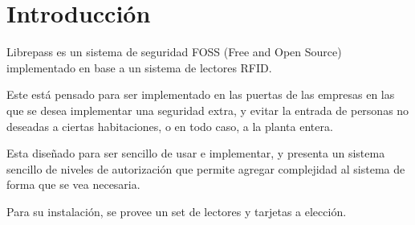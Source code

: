 \documentclass{article}
\begin{document}
\section{Introducción}
%
%
%

Librepass es un sistema de seguridad FOSS (Free and Open Source) implementado en
base a un sistema de lectores RFID.

Este está pensado para ser implementado en las puertas de las empresas en
las que se desea implementar una seguridad extra, y evitar la entrada de personas
no deseadas a ciertas habitaciones, o en todo caso, a la planta entera.

Esta diseñado para ser sencillo de usar e implementar, y presenta un sistema
sencillo de niveles de autorización que permite agregar complejidad al sistema
de forma que se vea necesaria.

Para su instalación, se provee un set de lectores y tarjetas a elección.
\end{document}
